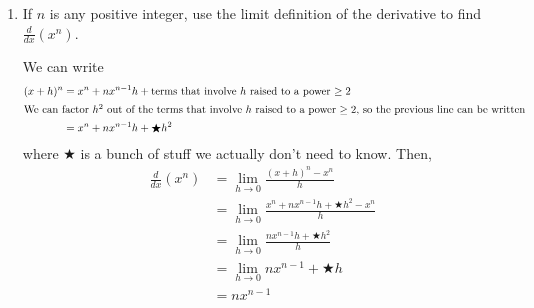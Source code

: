 \documentclass{article}
\begin{document}
\begin{enumerate}
  \begin{solution} 
    \begin{align*} 
      \displaystyle\frac{d}{dx}(x^4)& =\displaystyle \lim_{h \rightarrow 0 } \frac{ f(x+h) -f(x) }{h} \\
      & = \lim_{h \rightarrow 0} \frac{ (x+h)^4 - x^4}{h} \\ 
      & = \lim_{h \rightarrow 0} \frac{ x^4 +4x^3h+6x^2h^2+4xh^3+h^4 - x^4} {h} \\
      & = \lim_{h \rightarrow 0 } \frac{ 4x^3h+6x^2h^2+4xh^3+h^4}{h} \\
      &= \lim_{h \to 0} \frac{ h(4x^3 + 6x^2 h + 4x h^2 + h^3)}{h} \\
      & = \lim_{h \rightarrow 0 } 4x^3 +6x^2h+4xh^2+h^3 \\ 
      & = 4x^3
    \end{align*}
  \end{solution}  

\item  \label{power-rule}


  \begin{problem}[\vfill]
    If $n$ is any positive integer, use the limit definition of the
    derivative to find $\displaystyle\frac{d}{dx} \left(x^n \right)$.
  \end{problem}

  \begin{solution}
    We can write
    \begin{align*}
      (x + h)^n &= x^n + n x^{n - 1} h + \text{terms that involve $h$ raised to a power $\geq 2$} \\
      \intertext{We can factor $h^2$ out of the terms that involve $h$ raised to a power $\geq 2$, so the previous line can be written}
      &= x^n + n x^{n - 1} h + \bigstar h^2 
    \end{align*}
    where $\bigstar$ is a bunch of stuff we actually don't need to know.
    Then,
    \begin{align*} 
      \displaystyle\frac{d}{dx}(x^n)
      & = \lim_{h \rightarrow 0} \frac{ (x+h)^n - x^n}{h} \\
      & = \lim_{h \rightarrow 0} \frac{ x^n +nx^{n-1}h+ \bigstar h^2 - x^n} {h} \\
      & = \lim_{h \rightarrow 0 } \frac{nx^{n-1}h+\bigstar h^2}{h} \\
      & = \lim_{h \rightarrow 0 } nx^{n-1} + \bigstar h \\
      & = nx^{n-1}
    \end{align*}
  \end{solution}


\end{enumerate}
\end{document}
